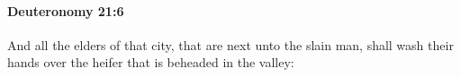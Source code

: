 
		\paragraph{Deuteronomy 21:6} %
			\label{DEUTERONOMY-21-6}

			And all the elders of that city, that are next unto the slain man, shall wash their hands over the heifer that is beheaded in the valley:


